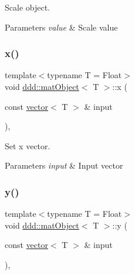 Scale object. 


\begin{DoxyParams}{Parameters}
{\em value} & Scale value \\
\hline
\end{DoxyParams}
\mbox{\label{classddd_1_1mat_object_a9b1d7066a88e2f1b6cfb101fb783fdf6}} 
\subsubsection{\texorpdfstring{x()}{x()}}
{\footnotesize\ttfamily template$<$typename T  = Float$>$ \\
void \hyperlink{classddd_1_1mat_object}{ddd\+::mat\+Object}$<$ T $>$\+::x (\begin{DoxyParamCaption}\item[{const \hyperlink{classddd_1_1vector}{vector}$<$ T $>$ \&}]{input }\end{DoxyParamCaption})\hspace{0.3cm}{\ttfamily [inline]}, {\ttfamily [inherited]}}



Set x vector. 


\begin{DoxyParams}{Parameters}
{\em input} & Input vector \\
\hline
\end{DoxyParams}
\mbox{\label{classddd_1_1mat_object_a638f5c083ccd96c6742f062d35810193}} 
\subsubsection{\texorpdfstring{y()}{y()}}
{\footnotesize\ttfamily template$<$typename T  = Float$>$ \\
void \hyperlink{classddd_1_1mat_object}{ddd\+::mat\+Object}$<$ T $>$\+::y (\begin{DoxyParamCaption}\item[{const \hyperlink{classddd_1_1vector}{vector}$<$ T $>$ \&}]{input }\end{DoxyParamCaption})\hspace{0.3cm}{\ttfamily [inline]}, {\ttfamily [inherited]}}



